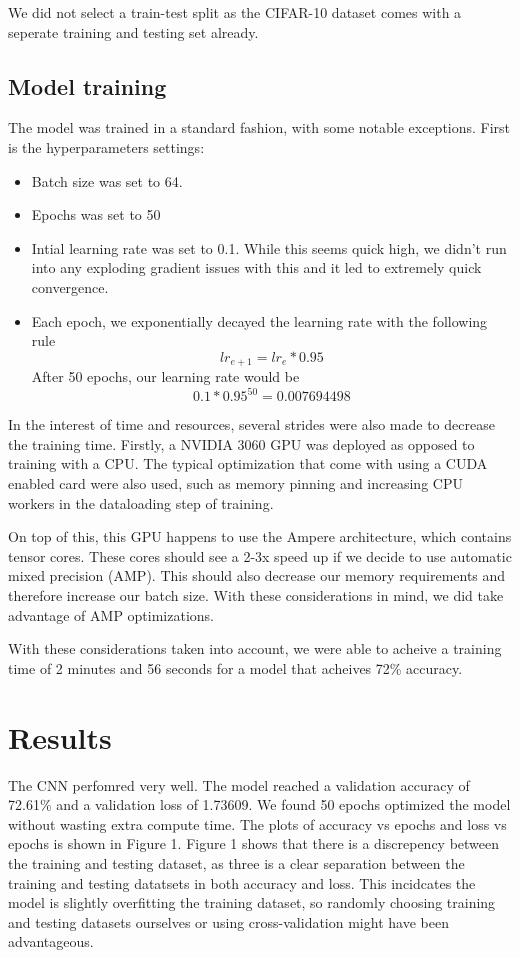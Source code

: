 \documentclass[letterpaper, 12pt]{article}
\begin{document}
We did not select a train-test split as the CIFAR-10 dataset comes with a seperate training and testing set already.

\subsection{Model training}
The model was trained in a standard fashion, with some notable exceptions. First is the hyperparameters settings:

\begin{itemize}
\item Batch size was set to 64.
\item Epochs was set to 50
\item Intial learning rate was set to 0.1. While this seems quick high, we didn't run into any exploding gradient issues with this and it led to extremely quick convergence.
\item Each epoch, we exponentially decayed the learning rate with the following rule \[lr_{e+1} = lr_{e} * 0.95\]
After 50 epochs, our learning rate would be \[0.1 * 0.95^{50} = 0.007694498\]
\end{itemize}

In the interest of time and resources, several strides were also made to decrease the training time. Firstly, a NVIDIA 3060 GPU was deployed as opposed to training with a CPU. The typical optimization that come with using a CUDA enabled card were also used, such as memory pinning and increasing CPU workers in the dataloading step of training.

On top of this, this GPU happens to use the Ampere architecture, which contains tensor cores. These cores should see a 2-3x speed up if we decide to use automatic mixed precision (AMP). This should also decrease our memory requirements and therefore increase our batch size. With these considerations in mind, we did take advantage of AMP optimizations.

With these considerations taken into account, we were able to acheive a training time of 2 minutes and 56 seconds for a model that acheives 72\% accuracy.


\section{Results}

The CNN perfomred very well.  The model reached a validation accuracy of 72.61\% and a validation loss of 1.73609. We found 50 epochs optimized the model without wasting extra compute time. The plots of accuracy vs epochs and loss vs epochs is shown in Figure 1. Figure 1 shows that there is a discrepency between the training and testing dataset, as three is a clear separation between the training and testing datatsets in both accuracy and loss. This incidcates the model is slightly overfitting the training dataset, so randomly choosing training and testing datasets ourselves or using cross-validation might have been advantageous.
\end{document}
